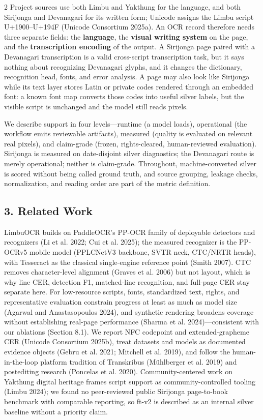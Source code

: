 \documentclass[
  10pt,
]{article}
\begin{document}
\begin{multicols}{2}
Project sources use both Limbu and Yakthung for the language, and both
Sirijonga and Devanagari for its written form; Unicode assigns the Limbu
script U+1900--U+194F (Unicode Consortium 2025a). An OCR record
therefore needs three separate fields: the \textbf{language}, the
\textbf{visual writing system} on the page, and the
\textbf{transcription encoding} of the output. A Sirijonga page paired
with a Devanagari transcription is a valid cross-script transcription
task, but it says nothing about recognizing Devanagari glyphs, and it
changes the dictionary, recognition head, fonts, and error analysis. A
page may also look like Sirijonga while its text layer stores Latin or
private codes rendered through an embedded font: a known font map
converts those codes into useful silver labels, but the visible script
is unchanged and the model still reads pixels.

We describe support in four levels---runtime (a model loads),
operational (the workflow emits reviewable artifacts), measured (quality
is evaluated on relevant real pixels), and claim-grade (frozen,
rights-cleared, human-reviewed evaluation). Sirijonga is measured on
date-disjoint silver diagnostics; the Devanagari route is merely
operational; neither is claim-grade. Throughout, machine-converted
silver is scored without being called ground truth, and source grouping,
leakage checks, normalization, and reading order are part of the metric
definition.

\subsection{3. Related Work}\label{related-work}

LimbuOCR builds on PaddleOCR's PP-OCR family of deployable detectors and
recognizers (Li et al. 2022; Cui et al. 2025); the measured recognizer
is the PP-OCRv5 mobile model (PPLCNetV3 backbone, SVTR neck, CTC/NRTR
heads), with Tesseract as the classical single-engine reference point
(Smith 2007). CTC removes character-level alignment (Graves et al. 2006)
but not layout, which is why line CER, detection F1, matched-line
recognition, and full-page CER stay separate here. For low-resource
scripts, fonts, standardized text, rights, and representative evaluation
constrain progress at least as much as model size (Agarwal and
Anastasopoulos 2024), and synthetic rendering broadens coverage without
establishing real-page performance (Sharma et al. 2024)---consistent
with our ablations (Section 8.1). We report NFC codepoint and
extended-grapheme CER (Unicode Consortium 2025b), treat datasets and
models as documented evidence objects (Gebru et al. 2021; Mitchell et
al. 2019), and follow the human-in-the-loop platform tradition of
Transkribus (Mühlberger et al. 2019) and postediting research (Poncelas
et al. 2020). Community-centered work on Yakthung digital heritage
frames script support as community-controlled tooling (Limbu 2024); we
found no peer-reviewed public Sirijonga page-to-book benchmark with
comparable reporting, so ft-v2 is described as an internal silver
baseline without a priority claim.


\end{multicols}
\end{document}
